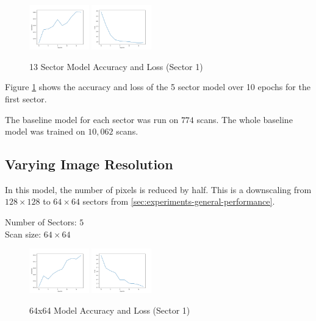 \documentclass[10pt,twocolumn,letterpaper]{article}
\begin{document}
         \begin{figure}[h]
            \centering
            \includegraphics[width=0.23\textwidth]{./images/training_accuracy_13_sector_128_px.png}
            \includegraphics[width=0.23\textwidth]{./images/training_loss_13_sector_128_px.png}
            \caption{13 Sector Model Accuracy and Loss (Sector 1)}
            \label{fig:experiments-13-sector-acc-loss}
         \end{figure}

         Figure \ref{fig:experiments-13-sector-acc-loss} shows the accuracy and loss of the 5 sector model over 10 epochs for the first sector.

         The baseline model for each sector was run on $774$ scans. The whole baseline model was trained on $10,062$ scans.
   \subsection{Varying Image Resolution} \label{sec:experiements-res}
      In this model, the number of pixels is reduced by half. This is a downscaling from $128 \times 128$ to $64 \times 64$ sectors from \ref{sec:experiments-general-performance}.
      \begin{center}
         Number of Sectors: $5$ \\
         Scan size: $64 \times 64$
      \end{center}

      \begin{figure}[h]
         \centering
         \includegraphics[width=0.23\textwidth]{./images/training_accuracy_5_sector_64_px.png}
         \includegraphics[width=0.23\textwidth]{./images/training_loss_5_sector_64_px.png}
         \caption{64x64 Model Accuracy and Loss (Sector 1)}
         \label{fig:experiments-64-px-acc-loss}
      \end{figure}
\end{document}
